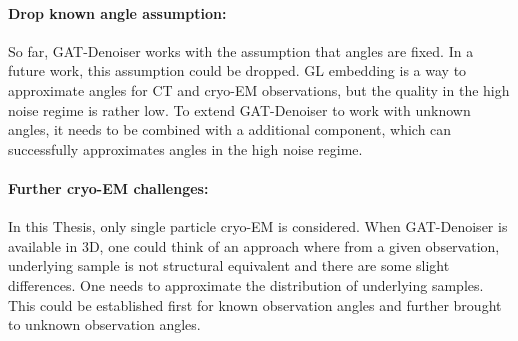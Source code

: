 \paragraph{Drop known angle assumption:}
So far, GAT-Denoiser works with the assumption that angles are fixed.
In a future work, this assumption could be dropped. GL embedding
is a way to approximate angles for CT and cryo-EM observations, but the quality in the high noise regime is rather low.
To extend GAT-Denoiser to work with unknown angles, it needs to be combined with a additional component, 
which can successfully approximates angles in the high noise regime.

\paragraph{Further cryo-EM challenges:}
In this Thesis, only single particle cryo-EM is considered.
When GAT-Denoiser is available in 3D, one could think of an approach
where from a given observation, underlying sample is not 
structural equivalent and there are some slight differences. 
One needs to approximate the distribution of underlying samples.
This could be established first for known observation angles and further brought to unknown observation angles.

